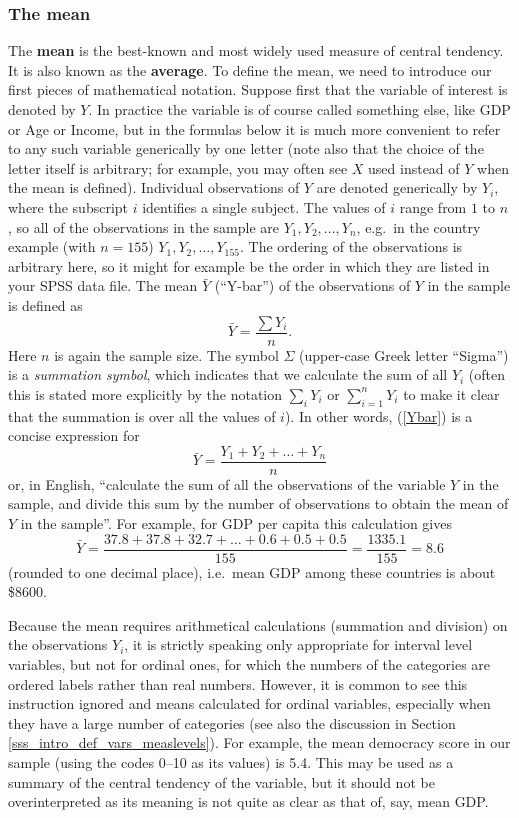 \subsubsection{The mean}

The \textbf{mean} is the best-known and most widely used measure of
central tendency. It is also known as the \textbf{average}. To define
the mean, we need to introduce our first pieces of mathematical
notation. Suppose first that the variable of interest is denoted by $Y$.
In practice the variable is of course called something else, like GDP or
Age or Income, but in the formulas below it is much more convenient to
refer to any such variable generically by one letter (note also that
the choice of the letter itself is arbitrary; for example, you may often
see $X$ used instead of $Y$ when the mean is defined). Individual
observations of $Y$ are denoted generically by $Y_{i}$, where the
subscript $i$ identifies a single subject. The values of $i$ range from
$1$ to $n$, so all of the observations in the sample are $Y_{1},
Y_{2}, \dots, Y_{n}$, e.g.\ in the country example (with $n=155$) $Y_{1},
Y_{2}, \dots, Y_{155}$. The ordering of the observations is arbitrary
here, so it might for example be the order in which they are listed in
your SPSS data file.
The mean $\bar{Y}$ (``Y-bar'') of
the observations of $Y$ in the sample is defined as
\begin{equation}
\bar{Y} = \frac{\sum Y_{i}}{n}.
\label{Ybar}
\end{equation}
Here $n$ is again the sample size.
The symbol $\Sigma$ (upper-case Greek
letter ``Sigma'') is a \emph{summation symbol}, which indicates that we
calculate the sum of all $Y_{i}$ (often this is stated more explicitly
by the notation $\sum_{i} Y_{i}$ or $\sum_{i=1}^{n} Y_{i}$
to make it clear that the
summation is over all the values of $i$). In other words, (\ref{Ybar})
is a concise expression for
\[
\bar{Y}= \frac{Y_{1}+Y_{2}+\dots+Y_{n}}{n}
\]
or, in English, ``calculate the sum of all the observations of the
variable $Y$ in the sample, and divide this sum by the number of
observations to obtain the mean of $Y$ in the sample''. For example, for
GDP per capita this calculation gives
\[
\bar{Y}= \frac{37.8+37.8+32.7+\dots+0.6+0.5+0.5}{155}
=\frac{1335.1}{155}=8.6
\]
(rounded to one decimal place), i.e.\ mean GDP among
these countries is about \$8600.

Because the mean requires arithmetical calculations (summation and
division) on the observations $Y_{i}$, it is strictly speaking only
appropriate for interval level variables, but not for ordinal ones,
for which the numbers of the categories are ordered labels rather than
real numbers. However, it is common to see this instruction ignored and
means calculated for ordinal variables, especially when they have a
large number of categories (see also the discussion in Section
\ref{sss_intro_def_vars_measlevels}). For example, the mean democracy
score in our sample (using the codes 0--10 as its values) is 5.4. This
may be used as a summary of the central tendency of the variable,
but it should not be overinterpreted as its meaning is not quite as
clear as that of, say, mean GDP.

